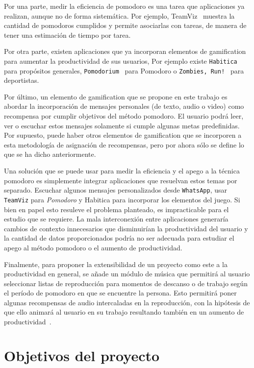 \documentclass[12pt,letterpaper]{report}
\begin{document}
Por una parte, medir la eficiencia de pomodoro es una tarea que aplicaciones ya realizan, aunque no de forma
sistemática. Por ejemplo, TeamViz~\cite{teamviz} muestra la cantidad de pomodoros cumplidos y permite asociarlas con
tareas, de manera de tener una estimación de tiempo por tarea.

Por otra parte, existen aplicaciones que ya incorporan elementos de gamification para aumentar la productividad de sus
usuarios, Por ejemplo existe \texttt{Habitica}~\cite{habitica} para propósitos generales,
\texttt{Pomodorium}~\cite{pomodorium} para Pomodoro o \texttt{Zombies, Run!}~\cite{zombiesrun} para deportistas.

Por último, un elemento de gamification que se propone en este trabajo es abordar la incorporación de mensajes
personales (de texto, audio o video) como recompensa por cumplir objetivos del método pomodoro. El usuario podrá leer,
ver o escuchar estos mensajes solamente si cumple algunas metas predefinidas. Por supuesto, puede haber otros elementos
de gamification que se incorporen a esta metodología de asignación de recompensas, pero por ahora sólo se define lo que
se ha dicho anteriormente.

Una solución que se puede usar para medir la eficiencia y el apego a la técnica pomodoro es simplemente integrar
aplicaciones que resuelvan estos temas por separado. Escuchar algunos mensajes personalizados desde \texttt{WhatsApp},
usar \texttt{TeamViz} para \emph{Pomodoro} y Habitica para incorporar los elementos del juego. Si bien en papel esto
resuleve el problema planteado, es impracticable para el estudio que se requiere. La mala interconexión entre
aplicaciones generaría cambios de contexto innecesarios que disminuirían la productividad del usuario y la cantidad de
datos proporcionados podría no ser adecuada para estudiar el apego al método pomodoro o el aumento de productividad.

Finalmente, para proponer la extensibilidad de un proyecto como este a la productividad en general, se añade un módulo
de música que permitirá al usuario seleccionar listas de reproducción para momentos de descanso o de trabajo según el
período de pomodoro en que se encuentre la persona. Esto permitirá poner algunas recompensas de audio intercaladas en la
reproducción, con la hipótesis de que ello animará al usuario en su trabajo resultando también en un aumento de
productividad~\cite{hallam2002effects}.

\newpage
\section{Objetivos del proyecto}\label{objetivos-del-proyecto}
\end{document}
